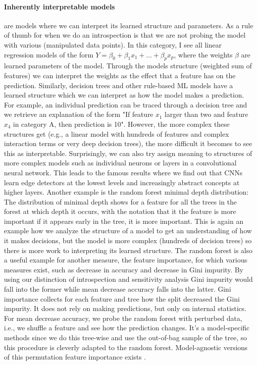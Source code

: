 \documentclass[runningheads]{llncs}
\begin{document}
\paragraph{Inherently interpretable models} are models where we can interpret its learned structure and parameters.
As a rule of thumb for when we do an introspection is that we are not probing the model with various (manipulated data points).
In this category, I see all linear regression models of the form $Y = \beta_0 + \beta_1 x_1 + \ldots + \beta_p x_p$, where the weights $\beta$ are learned parameters of the model.
Through the models structure (weighted sum of features) we can interpret the weights as the effect that a feature has on the prediction.
Similarly, decision trees and other rule-based ML models have a learned structure which we can interpret as how the model makes a prediction.
For example, an individual prediction can be traced through a decision tree and we retrieve an explanation of the form "If feature $x_1$ larger than two and feature $x_4$ in category A, then prediction is 10".
However, the more complex these structures get (e.g., a linear model with hundreds of features and complex interaction terms or very deep decision trees), the more difficult it becomes to see this as interpretable.
Surprisingly, we can also try assign meaning to structures of more complex models such as individual neurons or layers in a convolutional neural network.
This leads to the famous results where we find out that CNNs learn edge detectors at the lowest levels and increasingly abstract concepts at higher layers.
Another example is the random forest minimal depth distribution:\cite{randomForestExplainer}
The distribution of minimal depth shows for a feature for all the trees in the forest at which depth it occurs, with the notation that it the feature is more important if it appears early in the tree, it is more important.
This is again an example how we analyze the structure of a model to get an understanding of how it makes decisions, but the model is more complex (hundreds of decision trees) so there is more work to interpreting its learned structure.
The random forest is also a useful example for another measure, the feature importance, for which various measures exist, such as decrease in accuracy and decrease in Gini impurity.
By using our distinction of introspection and sensitivity analysis Gini impurity would fall into the former while mean decrease accuracy falls into the latter.
Gini importance collects for each feature and tree how the split decreased the Gini impurity.
It does not rely on making predictions, but only on internal statistics.
For mean decrease accuracy, we probe the random forest with perturbed data, i.e., we shuffle a feature and see how the prediction changes.
It's a model-specific methods since we do this tree-wise and use the out-of-bag sample of the tree, so this procedure is cleverly adapted to the random forest.
Model-agnostic versions of this permutation feature importance exists \cite{fisher2019all}.
\end{document}
